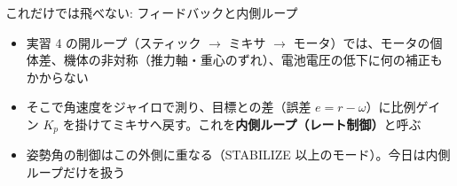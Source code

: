 %

\begin{frame}{これだけでは飛べない: フィードバックと内側ループ}
  \begin{center}
  \end{center}

  \vspace{-0.2em}
  \begin{itemize}\footnotesize\setlength{\itemsep}{1pt}
    \item 実習 4 の開ループ（スティック $\to$ ミキサ $\to$ モータ）では、モータの個体差、機体の非対称（推力軸・重心のずれ）、電池電圧の低下に何の補正もかからない
    \item そこで角速度をジャイロで測り、目標との差（誤差 $e=r-\omega$）に比例ゲイン $K_p$ を掛けてミキサへ戻す。これを\textbf{内側ループ（レート制御）}と呼ぶ
    \item 姿勢角の制御はこの外側に重なる（STABILIZE 以上のモード）。今日は内側ループだけを扱う
  \end{itemize}
\end{frame}

